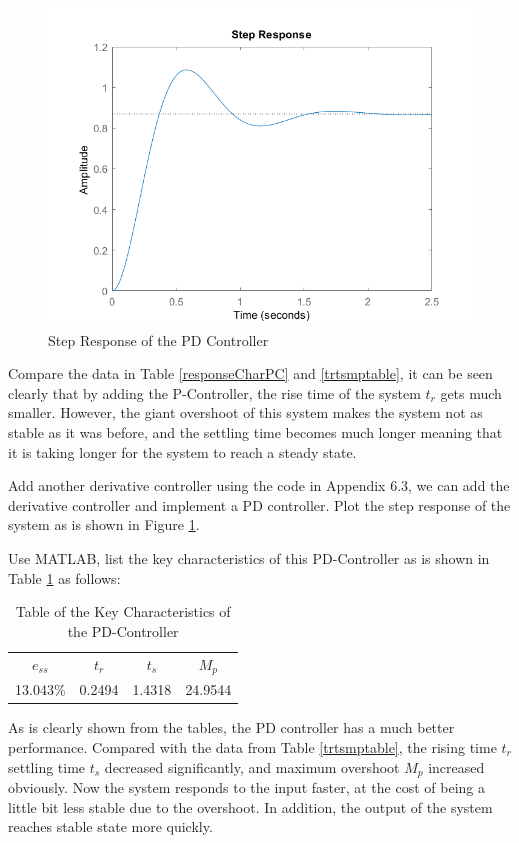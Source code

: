 \documentclass[a4paper, twocolumn, titlepage, 10pt]{article}
\begin{document}
		\begin{figure}[H]
			\centering
			\includegraphics[width=\linewidth]{StepPD}
			\caption{Step Response of the PD Controller}
			\label{StepPD}
		\end{figure}
		Compare the data in Table \ref{responseCharPC} and \ref{trtsmptable}, it can be seen clearly that by adding the P-Controller, the rise time of the system $t_r$ gets much smaller. However, the giant overshoot of this system makes the system not as stable as it was before, and the settling time becomes much longer meaning that it is taking longer for the system to reach a steady state.
		
		Add another derivative controller using the code in Appendix 6.3, we can add the derivative controller and implement a PD controller. Plot the step response of the system as is shown in Figure \ref{StepPD}.
		
		Use MATLAB, list the key characteristics of this PD-Controller as is shown in Table \ref{responseCharPD} as follows:
		\begin{table}[H]
			\centering
			\begin{tabular}{c c c c}
				$e_{ss}$ & $t_r$ & $t_s$ & $M_p$ \\
				13.043\% & 0.2494 & 1.4318 & 24.9544
			\end{tabular}
			\caption{Table of the Key Characteristics of the PD-Controller}
			\label{responseCharPD}
		\end{table}
	
		As is clearly shown from the tables, the PD controller has a much better performance. Compared with the data from Table \ref{trtsmptable}, the rising time $t_r$ settling time $t_s$ decreased significantly, and maximum overshoot $M_p$ increased obviously. Now the system responds to the input faster, at the cost of being a little bit less stable due to the overshoot. In addition, the output of the system reaches stable state more quickly.
		
\end{document}
